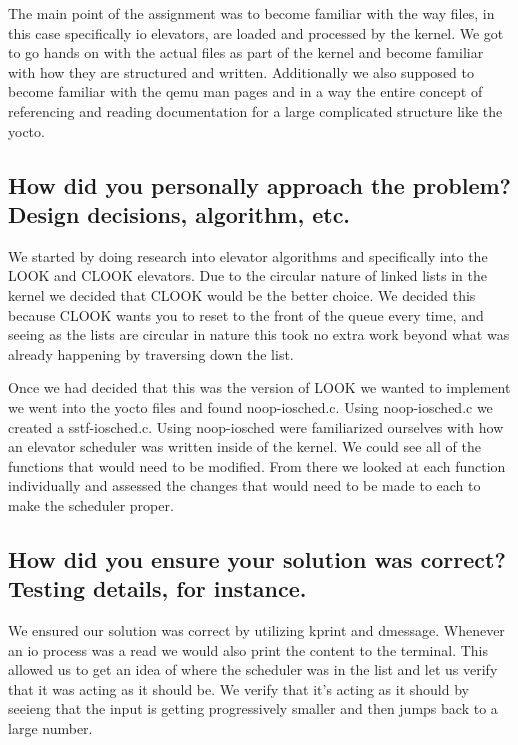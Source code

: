 \documentclass[letterpaper,10pt,titlepage]{article}
\begin{document}
 \sloppy The main point of the assignment was to become familiar with the way files, in this case specifically io elevators, are loaded and processed by the kernel. We got to go hands on with the actual files as part of the kernel and become familiar with how they are structured and written. Additionally we also supposed to become familiar with the qemu man pages and in a way the entire concept of referencing and reading documentation for a large complicated structure like the yocto.

\subsection{How did you personally approach the problem? Design decisions, algorithm, etc.}

 \sloppy We started by doing research into elevator algorithms and specifically into the LOOK and CLOOK elevators. Due to the circular nature of linked lists in the kernel we decided that CLOOK would be the better choice. We decided this because CLOOK wants you to reset to the front of the queue every time, and seeing as the lists are circular in nature this took no extra work beyond what was already happening by traversing down the list.
 
Once we had decided that this was the version of LOOK we wanted to implement we went into the yocto files and found noop-iosched.c. Using noop-iosched.c we created a sstf-iosched.c. Using noop-iosched were familiarized ourselves with how an elevator scheduler was written inside of the kernel. We could see all of the functions that would need to be modified. From there we looked at each function individually and assessed the changes that would need to be made to each to make the scheduler proper.

\subsection{How did you ensure your solution was correct? Testing details, for instance.}

\sloppy We ensured our solution was correct by utilizing kprint and dmessage. Whenever an io process was a read we would also print the content to the terminal. This allowed us to get an idea of where the scheduler was in the list and let us verify that it was acting as it should be. We verify that it's acting as it should by seeieng that the input is getting progressively smaller and then jumps back to a large number.
\end{document}
